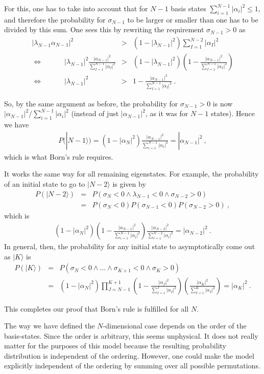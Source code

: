 \documentclass[11pt,twoside,A4]{article}
\def\beqn{\begin{eqnarray}}
\def\eeqn{\end{eqnarray}}
\begin{document}
For this, one has to take into account that for $N-1$ basis states  $\sum_{i=1}^{N-1} |\alpha_i|^2 \leq 1$, and therefore the probability for $\sigma_{N-1}$ to be larger or smaller than one has to be divided by this sum. One sees this by rewriting the requirement $\sigma_{N-1} > 0$ as
\beqn
|  \lambda_{N-1} \alpha_{N-1} |^2 &>& (1 -  |\lambda_{N-1}|^2)  \sum_{I=1}^{N-2} |\alpha_I|^2  \nonumber\\
\Leftrightarrow \quad \quad \quad |  \lambda_{N-1}|^2 \frac{|\alpha_{N-1} |^2}{\sum_{I=1}^{N-1} |\alpha_I|^2}  &>& (1 -  | \lambda_{N-1}|^2) \left(1- \frac{|\alpha_{N-1}|^2}{\sum_{I=1}^{N-1} |\alpha_I|^2} \right) \nonumber\\
\Leftrightarrow \quad \quad \quad| \lambda_{N-1}|^2 &>& 1- \frac{|\alpha_{N-1}|^2}{\sum_{I=1}^{N-1} |\alpha_I|^2}~. \label{prop2}
\eeqn

So, by the same argument as before, the probability for $\sigma_{N-1} > 0$ is now $|\alpha_{N-1}|^2/\sum_{i=1}^{N-1} |\alpha_i|^2$ (instead of just $|\alpha_{N-1}|^2$, as it was for $N-1$ states). Hence we have
\beqn
P(|N-1 \rangle) = ( 1- |\alpha_{N}|^2)  \frac{ |\alpha_{N-1}|^2}{\sum_{i=1}^{N-1} |\alpha_i|^2} = |\alpha_{N-1}|^2~,
\eeqn
which is what Born's rule requires. 

It works the same way for all remaining eigenstates. For example, the probability of an initial state to go to $|N-2 \rangle$ is given by
\beqn
P(|N-2\rangle) &=& P(\sigma_{N} < 0 \wedge \lambda_{N-1} < 0 \wedge \sigma_{N-2} >0) \nonumber \\
&=&  
P(\sigma_{N} < 0) P(\sigma_{N-1} < 0)P (\sigma_{N-2} >0)~,
\eeqn
 which is
\beqn
( 1- |\alpha_{N}|^2)  \left( 1- \frac{ |\alpha_{N-1}|^2}{\sum_{i=1}^{N-1} |\alpha_i|^2} \right) \frac{ |\alpha_{N-2}|^2}{\sum_{i=1}^{N-2} |\alpha_i|^2} = |\alpha_{N-2}|^2~.
\eeqn
In general, then, the probability for any initial state to asymptotically come out as $|K\rangle$ is 
\beqn
P(| K \rangle)  &=& P(\sigma_{N} < 0 \wedge...\wedge \sigma_{K+1} < 0 \wedge \sigma_{K} >0) \nonumber \\
&=& (1- |\alpha_{N}|^2) \prod_{J=N-1}^{K+1} \left( 1- \frac{ |\alpha_{J}|^2}{\sum_{I=1}^{J} |\alpha_I|^2} \right) \left(\frac{ |\alpha_{K}|^2}{\sum_{I=1}^{K} |\alpha_I|^2}\right) = |\alpha_{K}|^2~.
\eeqn

This completes our proof that Born's rule is fulfilled for all $N$.

The way we have defined the $N$-dimensional case depends on the order of the basis-states. Since the order is arbitrary, this seems unphysical. It does not really matter for the purposes of this model because the resulting probability distribution is independent of the ordering. However, one could make the model explicitly independent of the ordering by summing over all possible permutations. 
\end{document}
